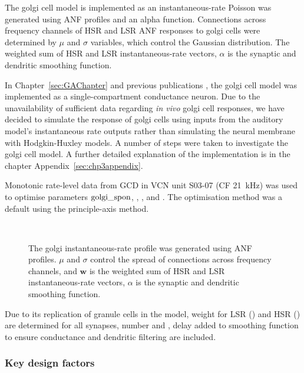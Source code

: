 The golgi cell model is implemented as an instantaneous-rate Poisson
was generated using ANF profiles and an alpha function. Connections
across frequency channels of HSR and LSR ANF responses to golgi cells
were determined by $\mu$ and $\sigma$ variables, which control the
Gaussian distribution. The weighted sum of HSR and LSR
instantaneous-rate vectors, $\alpha$ is the synaptic and dendritic
smoothing function.  \medskip{}

In Chapter~\ref{sec:GAChapter} and previous publications
\citep{EagerGraydenEtAl:2006a}, the golgi cell model was implemented
as a single-compartment conductance neuron. Due to the unavailability
of sufficient data regarding \emph{in vivo} golgi cell responses, we
have decided to simulate the response of golgi cells using inputs from
the auditory model's instantaneous rate outputs rather than simulating
the neural membrane with Hodgkin-Huxley models.  A number of steps
were taken to investigate the golgi cell model. A further detailed
explanation of the implementation is in the chapter
Appendix~\ref{sec:chp3appendix}.

\medskip{}

Monotonic rate-level data from GCD in VCN \citep{GhoshalKim:1996} unit
S03-07 (CF 21~kHz) was used to optimise parameters ${\rm
golgi\_spon}$, \wLSRGLG, \wHSRGLG, and \sANFGLG\@.  The optimisation
method was a default using the principle-axis method.

 \begin{figure}[htb]
   \centering
   \\
   \caption{The golgi instantaneous-rate profile was generated using ANF
     profiles. $\mu$ and $\sigma$ control the spread of connections
     across frequency channels, and $\mathbf{w}$ is
     the weighted sum of HSR and LSR instantaneous-rate vectors,
     $\alpha$ is the synaptic and dendritic smoothing function.}\label{fig:GolgiDiagram}
 \end{figure}

\medskip{}

Due to its replication of granule cells in the model, weight for LSR
(\wLSRGLG) and HSR (\wHSRGLG) are determined for all synapses, number
\nLSRDS and \nHSRDS, delay \dANFGLG added to smoothing function to
ensure conductance and dendritic filtering are included.

\subsubsection{Key design factors}

